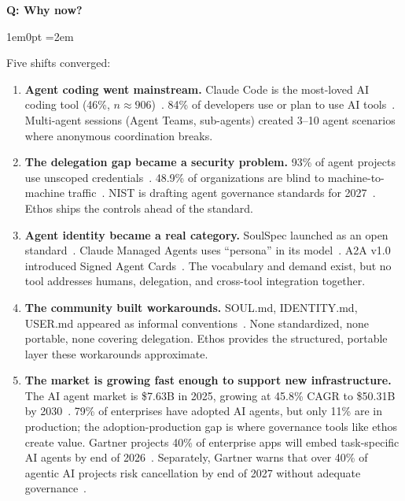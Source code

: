 \documentclass[11pt,letterpaper]{article}
\newcounter{faqnum}
\newenvironment{faqpair}[1]{%
  \needspace{4\baselineskip}%
  \vspace{0.5em}%
  \refstepcounter{faqnum}%
  \noindent\textbf{\color{SectionBlue}Q\thefaqnum: #1}\par\nopagebreak[4]%
  \vspace{0.2em}%
  \begin{adjustwidth}{1em}{0pt}%
  \setlength{\parindent}{0pt}%
  \emergencystretch=2em%
}{%
  \end{adjustwidth}%
  \vspace{0.5em}%
}
\begin{document}
\begin{faqpair}{Why now?}
Five shifts converged:

\begin{enumerate}[nosep]
  \item \textbf{Agent coding went mainstream.} Claude Code is the most-loved AI coding tool (46\%, $n{\approx}906$)~\cite{pragmaticengsurvey2026}. 84\% of developers use or plan to use AI tools~\cite{stackoverflow2025survey}. Multi-agent sessions (Agent Teams, sub-agents) created 3--10 agent scenarios where anonymous coordination breaks.
  \item \textbf{The delegation gap became a security problem.} 93\% of agent projects use unscoped credentials~\cite{grantexagentsec2026}. 48.9\% of organizations are blind to machine-to-machine traffic~\cite{saltsecurity2026agentsec}. NIST is drafting agent governance standards for 2027~\cite{nistcosais2026}. Ethos ships the controls ahead of the standard.
  \item \textbf{Agent identity became a real category.} SoulSpec launched as an open standard~\cite{soulspec2026standard}. Claude Managed Agents uses ``persona'' in its model~\cite{claudemanagedagents2026}. A2A v1.0 introduced Signed Agent Cards~\cite{a2av1milestone2026}. The vocabulary and demand exist, but no tool addresses humans, delegation, and cross-tool integration together.
  \item \textbf{The community built workarounds.} SOUL.md, IDENTITY.md, USER.md appeared as informal conventions~\cite{blueoctopus2025soulmd}. None standardized, none portable, none covering delegation. Ethos provides the structured, portable layer these workarounds approximate.
  \item \textbf{The market is growing fast enough to support new infrastructure.} The AI agent market is \$7.63B in 2025, growing at 45.8\% CAGR to \$50.31B by 2030~\cite{aidemandsageagents2026}. 79\% of enterprises have adopted AI agents, but only 11\% are in production; the adoption-production gap is where governance tools like ethos create value. Gartner projects 40\% of enterprise apps will embed task-specific AI agents by end of 2026~\cite{gartner2025multiagentsurge}. Separately, Gartner warns that over 40\% of agentic AI projects risk cancellation by end of 2027 without adequate governance~\cite{gartner2025agenticcancellation}.
\end{enumerate}
\end{faqpair}

\end{document}
